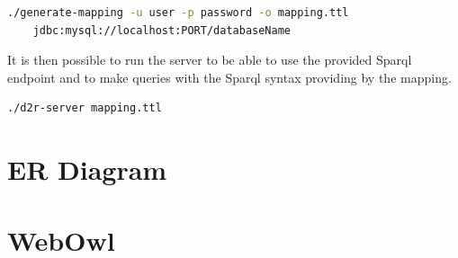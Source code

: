 \documentclass[a4paper,12pt]{article}
\begin{document}
\begin{lstlisting}[language=bash]
./generate-mapping -u user -p password -o mapping.ttl 
	jdbc:mysql://localhost:PORT/databaseName
\end{lstlisting}

It is then possible to run the server to be able to use the provided Sparql endpoint and to make queries with the Sparql syntax providing by the mapping.

\begin{lstlisting}
./d2r-server mapping.ttl
\end{lstlisting}

\section{ER Diagram}
\begin{center}
\end{center}
\section{WebOwl}
\begin{center}
\end{center}
\end{document}
